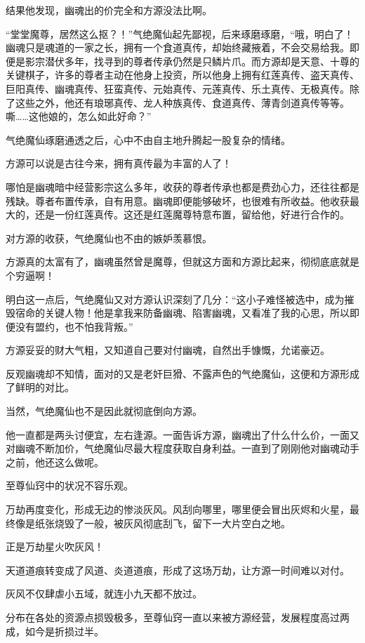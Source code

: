 \begin{this_body}
结果他发现，幽魂出的价完全和方源没法比啊。

“堂堂魔尊，居然这么抠？！”气绝魔仙起先鄙视，后来琢磨琢磨，“哦，明白了！幽魂只是魂道的一家之长，拥有一个食道真传，却始终藏掖着，不会交易给我。即便是影宗潜伏多年，找寻到的尊者传承仍然是只鳞片爪。而方源却是天意、十尊的关键棋子，许多的尊者主动在他身上投资，所以他身上拥有红莲真传、盗天真传、巨阳真传、幽魂真传、狂蛮真传、元始真传、元莲真传、乐土真传、无极真传。除了这些之外，他还有琅琊真传、龙人种族真传、食道真传、薄青剑道真传等等。嘶……这他娘的，怎么如此好命？”

气绝魔仙琢磨通透之后，心中不由自主地升腾起一股复杂的情绪。

方源可以说是古往今来，拥有真传最为丰富的人了！

哪怕是幽魂暗中经营影宗这么多年，收获的尊者传承也都是费劲心力，还往往都是残缺。尊者布置传承，自有用意。幽魂即便能够破坏，也很难有所收益。他收获最大的，还是一份红莲真传。这还是红莲魔尊特意布置，留给他，好进行合作的。

对方源的收获，气绝魔仙也不由的嫉妒羡慕恨。

方源真的太富有了，幽魂虽然曾是魔尊，但就这方面和方源比起来，彻彻底底就是个穷逼啊！

明白这一点后，气绝魔仙又对方源认识深刻了几分：“这小子难怪被选中，成为摧毁宿命的关键人物！他是拿我来防备幽魂、陷害幽魂，又看准了我的心思，所以即便没有盟约，也不怕我背叛。”

方源妥妥的财大气粗，又知道自己要对付幽魂，自然出手慷慨，允诺豪迈。

反观幽魂却不知情，面对的又是老奸巨猾、不露声色的气绝魔仙，这便和方源形成了鲜明的对比。

当然，气绝魔仙也不是因此就彻底倒向方源。

他一直都是两头讨便宜，左右逢源。一面告诉方源，幽魂出了什么什么价，一面又对幽魂不断加价，气绝魔仙尽最大程度获取自身利益。一直到了刚刚他对幽魂动手之前，他还这么做呢。

至尊仙窍中的状况不容乐观。

万劫再度变化，形成无边的惨淡灰风。风刮向哪里，哪里便会冒出灰烬和火星，最终像是纸张烧毁了一般，被灰风彻底刮飞，留下一大片空白之地。

正是万劫星火吹灰风！

天道道痕转变成了风道、炎道道痕，形成了这场万劫，让方源一时间难以对付。

灰风不仅肆虐小五域，就连小九天都不放过。

分布在各处的资源点损毁极多，至尊仙窍一直以来被方源经营，发展程度高过两成，如今是折损过半。


\end{this_body}
